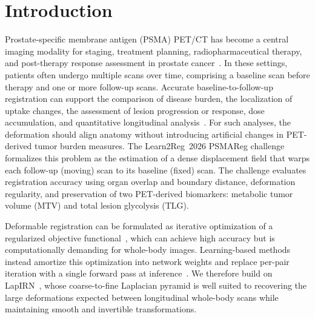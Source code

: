 \section{Introduction}

Prostate-specific membrane antigen (PSMA) PET/CT has become a central imaging modality for staging, treatment planning, radiopharmaceutical therapy, and post-therapy response assessment in prostate cancer~\cite{ref_psma_clinical}.
In these settings, patients often undergo multiple scans over time, comprising a baseline scan before therapy and one or more follow-up scans.
Accurate baseline-to-follow-up registration can support the comparison of disease burden, the localization of uptake changes, the assessment of lesion progression or response, dose accumulation, and quantitative longitudinal analysis~\cite{ref_psmareg_challenge}.
For such analyses, the deformation should align anatomy without introducing artificial changes in PET-derived tumor burden measures.
The Learn2Reg~2026 PSMAReg challenge~\cite{ref_learn2reg_alessa,ref_learn2reg_hansen,ref_psmaregdata} formalizes this problem as the estimation of a dense displacement field that warps each follow-up (moving) scan to its baseline (fixed) scan.
The challenge evaluates registration accuracy using organ overlap and boundary distance, deformation regularity, and preservation of two PET-derived biomarkers: metabolic tumor volume (MTV) and total lesion glycolysis (TLG).

Deformable registration can be formulated as iterative optimization of a regularized objective functional~\cite{ref_demons,ref_syn,bspline}, which can achieve high accuracy but is computationally demanding for whole-body images.
Learning-based methods instead amortize this optimization into network weights and replace per-pair iteration with a single forward pass at inference~\cite{ref_voxelmorph_cvpr,ref_svf_voxelmorph,ref_transmorph}.
We therefore build on LapIRN~\cite{ref_lapirn}, whose coarse-to-fine Laplacian pyramid is well suited to recovering the large deformations expected between longitudinal whole-body scans while maintaining smooth and invertible transformations.





